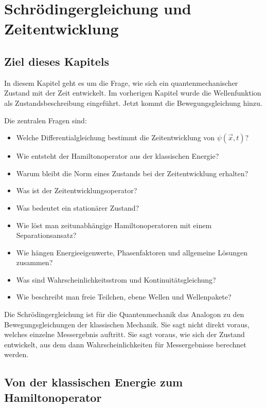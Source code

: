 \chapter{Schrödingergleichung und Zeitentwicklung}

\section{Ziel dieses Kapitels}

In diesem Kapitel geht es um die Frage, wie sich ein quantenmechanischer Zustand mit der Zeit entwickelt. Im vorherigen Kapitel wurde die Wellenfunktion als Zustandsbeschreibung eingeführt. Jetzt kommt die Bewegungsgleichung hinzu.

Die zentralen Fragen sind:
\begin{itemize}
    \item Welche Differentialgleichung bestimmt die Zeitentwicklung von $\psi(\vec{x},t)$?
    \item Wie entsteht der Hamiltonoperator aus der klassischen Energie?
    \item Warum bleibt die Norm eines Zustands bei der Zeitentwicklung erhalten?
    \item Was ist der Zeitentwicklungsoperator?
    \item Was bedeutet ein stationärer Zustand?
    \item Wie löst man zeitunabhängige Hamiltonoperatoren mit einem Separationsansatz?
    \item Wie hängen Energieeigenwerte, Phasenfaktoren und allgemeine Lösungen zusammen?
    \item Was sind Wahrscheinlichkeitsstrom und Kontinuitätsgleichung?
    \item Wie beschreibt man freie Teilchen, ebene Wellen und Wellenpakete?
\end{itemize}

\begin{conceptbox}
Die Schrödingergleichung ist für die Quantenmechanik das Analogon zu den Bewegungsgleichungen der klassischen Mechanik. Sie sagt nicht direkt voraus, welches einzelne Messergebnis auftritt. Sie sagt voraus, wie sich der Zustand entwickelt, aus dem dann Wahrscheinlichkeiten für Messergebnisse berechnet werden.
\end{conceptbox}

\section{Von der klassischen Energie zum Hamiltonoperator}


